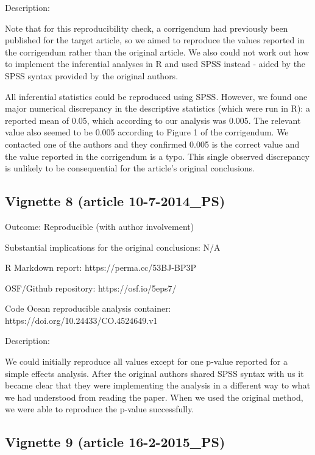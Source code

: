 \begin{appendix}
Description:

Note that for this reproducibility check, a corrigendum had previously
been published for the target article, so we aimed to reproduce the
values reported in the corrigendum rather than the original article. We
also could not work out how to implement the inferential analyses in R
and used SPSS instead - aided by the SPSS syntax provided by the
original authors.

All inferential statistics could be reproduced using SPSS. However, we
found one major numerical discrepancy in the descriptive statistics
(which were run in R): a reported mean of 0.05, which according to our
analysis was 0.005. The relevant value also seemed to be 0.005 according
to Figure 1 of the corrigendum. We contacted one of the authors and they
confirmed 0.005 is the correct value and the value reported in the
corrigendum is a typo. This single observed discrepancy is unlikely to
be consequential for the article's original conclusions.

\hypertarget{vignette-8-article-10-7-2014_ps}{%
\subsection{Vignette 8 (article
10-7-2014\_PS)}\label{vignette-8-article-10-7-2014_ps}}

Outcome: Reproducible (with author involvement)

Substantial implications for the original conclusions: N/A

R Markdown report: https://perma.cc/53BJ-BP3P

OSF/Github repository: https://osf.io/5eps7/

Code Ocean reproducible analysis container:
https://doi.org/10.24433/CO.4524649.v1

Description:

We could initially reproduce all values except for one p-value reported
for a simple effects analysis. After the original authors shared SPSS
syntax with us it became clear that they were implementing the analysis
in a different way to what we had understood from reading the paper.
When we used the original method, we were able to reproduce the p-value
successfully.

\hypertarget{vignette-9-article-16-2-2015_ps}{%
\subsection{Vignette 9 (article
16-2-2015\_PS)}\label{vignette-9-article-16-2-2015_ps}}


\end{appendix}
